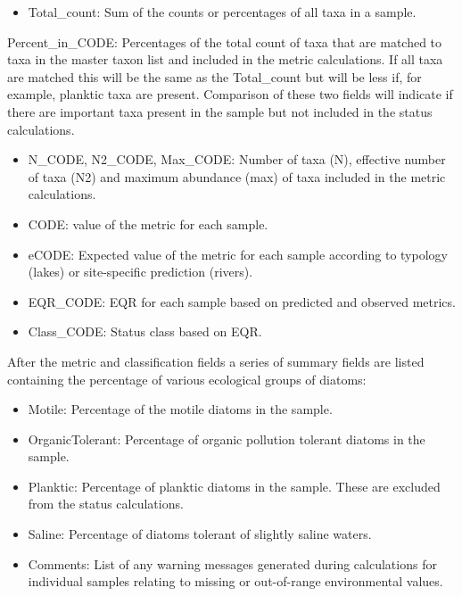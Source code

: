 \documentclass[
]{article}
\providecommand{\tightlist}{%
  \setlength{\itemsep}{0pt}\setlength{\parskip}{0pt}}
\begin{document}
\begin{itemize}
\tightlist
\item
  Total\_count: Sum of the counts or percentages of all taxa in a
  sample.
\end{itemize}

Percent\_in\_CODE: Percentages of the total count of taxa that are
matched to taxa in the master taxon list and included in the metric
calculations. If all taxa are matched this will be the same as the
Total\_count but will be less if, for example, planktic taxa are
present. Comparison of these two fields will indicate if there are
important taxa present in the sample but not included in the status
calculations.

\begin{itemize}
\item
  N\_CODE, N2\_CODE, Max\_CODE: Number of taxa (N), effective number of
  taxa (N2) and maximum abundance (max) of taxa included in the metric
  calculations.
\item
  CODE: value of the metric for each sample.
\item
  eCODE: Expected value of the metric for each sample according to
  typology (lakes) or site-specific prediction (rivers).
\item
  EQR\_CODE: EQR for each sample based on predicted and observed
  metrics.
\item
  Class\_CODE: Status class based on EQR.
\end{itemize}

After the metric and classification fields a series of summary fields
are listed containing the percentage of various ecological groups of
diatoms:

\begin{itemize}
\item
  Motile: Percentage of the motile diatoms in the sample.
\item
  OrganicTolerant: Percentage of organic pollution tolerant diatoms in
  the sample.
\item
  Planktic: Percentage of planktic diatoms in the sample. These are
  excluded from the status calculations.
\item
  Saline: Percentage of diatoms tolerant of slightly saline waters.
\item
  Comments: List of any warning messages generated during calculations
  for individual samples relating to missing or out-of-range
  environmental values.
\end{itemize}
\end{document}
